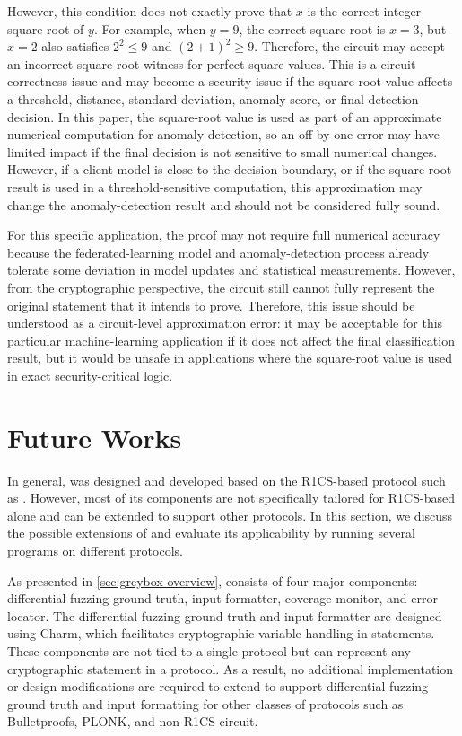However, this condition does not exactly prove that \(x\) is the correct integer square root of \(y\). For example, when \(y=9\), the correct square root is \(x=3\), but \(x=2\) also satisfies \(2^2 \leq 9\) and \((2+1)^2 \geq 9\). Therefore, the circuit may accept an incorrect square-root witness for perfect-square values. This is a circuit correctness issue and may become a security issue if the square-root value affects a threshold, distance, standard deviation, anomaly score, or final detection decision. In this paper, the square-root value is used as part of an approximate numerical computation for anomaly detection, so an off-by-one error may have limited impact if the final decision is not sensitive to small numerical changes. However, if a client model is close to the decision boundary, or if the square-root result is used in a threshold-sensitive computation, this approximation may change the anomaly-detection result and should not be considered fully sound.

For this specific application, the \zksnark proof may not require full numerical accuracy because the federated-learning model and anomaly-detection process already tolerate some deviation in model updates and statistical measurements. However, from the cryptographic perspective, the circuit still cannot fully represent the original statement that it intends to prove. Therefore, this issue should be understood as a circuit-level approximation error: it may be acceptable for this particular machine-learning application if it does not affect the final classification result, but it would be unsafe in applications where the square-root value is used in exact security-critical logic.


\section{Future Works}
In general, \greyboxfuzz was designed and developed based on the R1CS-based \zksnark protocol such as . However, most of its components are not specifically tailored for R1CS-based \zksnark alone and can be extended to support other \zkp protocols. In this section, we discuss the possible extensions of \greyboxfuzz and evaluate its applicability by running several programs on different \zkp protocols.

As presented in \autoref{sec:greybox-overview}, \greyboxfuzz consists of four major components: differential fuzzing ground truth, input formatter, coverage monitor, and error locator. The differential fuzzing ground truth and input formatter are designed using Charm, which facilitates cryptographic variable handling in \zkp statements. These components are not tied to a single \zksnark protocol but can represent any cryptographic statement in a \zkp protocol. As a result, no additional implementation or design modifications are required to extend \greyboxfuzz to support differential fuzzing ground truth and input formatting for other classes of \zkp protocols such as Bulletproofs, PLONK, and non-R1CS circuit.

